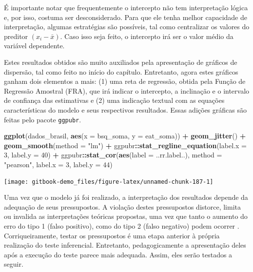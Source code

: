 \documentclass[
]{book}
\newenvironment{Shaded}{\begin{snugshade}}{\end{snugshade}}
\newcommand{\DataTypeTok}[1]{\textcolor[rgb]{0.13,0.29,0.53}{#1}}
\newcommand{\DecValTok}[1]{\textcolor[rgb]{0.00,0.00,0.81}{#1}}
\newcommand{\KeywordTok}[1]{\textcolor[rgb]{0.13,0.29,0.53}{\textbf{#1}}}
\newcommand{\NormalTok}[1]{#1}
\newcommand{\OperatorTok}[1]{\textcolor[rgb]{0.81,0.36,0.00}{\textbf{#1}}}
\newcommand{\StringTok}[1]{\textcolor[rgb]{0.31,0.60,0.02}{#1}}
\begin{document}
É importante notar que frequentemente o intercepto não tem interpretação lógica e, por isso, costuma ser desconsiderado. Para que ele tenha melhor capacidade de interpretação, algumas estratégias são possíveis, tal como centralizar os valores do preditor \((x_i-\bar{x})\). Caso isso seja feito, o intercepto irá ser o valor médio da variável dependente.

Estes resultados obtidos são muito auxiliados pela apresentação de gráficos de dispersão, tal como feito no início do capítulo. Entretanto, agora estes gráficos ganham dois elementos a mais: (1) uma reta de regressão, obtida pela Função de Regressão Amostral (FRA), que irá indicar o intercepto, a inclinação e o intervalo de confiança das estimativas e (2) uma indicação textual com as equações características do modelo e seus respectivos resultados. Essas adições gráficas são feitas pelo pacote \texttt{ggpubr}.

\begin{Shaded}
\begin{Highlighting}[]
\KeywordTok{ggplot}\NormalTok{(dados_brasil, }\KeywordTok{aes}\NormalTok{(}\DataTypeTok{x =}\NormalTok{ bsq_soma, }\DataTypeTok{y =}\NormalTok{ eat_soma)) }\OperatorTok{+}
\StringTok{  }\KeywordTok{geom_jitter}\NormalTok{() }\OperatorTok{+}\StringTok{ }\KeywordTok{geom_smooth}\NormalTok{(}\DataTypeTok{method =} \StringTok{"lm"}\NormalTok{) }\OperatorTok{+}\StringTok{ }
\StringTok{  }\NormalTok{ggpubr}\OperatorTok{::}\KeywordTok{stat_regline_equation}\NormalTok{(}\DataTypeTok{label.x =} \DecValTok{3}\NormalTok{, }\DataTypeTok{label.y =} \DecValTok{40}\NormalTok{) }\OperatorTok{+}
\StringTok{  }\NormalTok{ggpubr}\OperatorTok{::}\KeywordTok{stat_cor}\NormalTok{(}\KeywordTok{aes}\NormalTok{(}\DataTypeTok{label =}\NormalTok{  ..rr.label..), }\DataTypeTok{method =} \StringTok{"pearson"}\NormalTok{, }\DataTypeTok{label.x =} \DecValTok{3}\NormalTok{, }\DataTypeTok{label.y =} \DecValTok{44}\NormalTok{)}
\end{Highlighting}
\end{Shaded}

\begin{center}\texttt{[image: gitbook-demo\_files/figure-latex/unnamed-chunk-187-1]} \end{center}

Uma vez que o modelo já foi realizado, a interpretação dos resultados depende da adequação de seus pressupostos. A violação destes pressupostos distorce, limita ou invalida as interpretações teóricas propostas, uma vez que tanto o aumento do erro do tipo 1 (falso positivo), como do tipo 2 (falso negativo) podem ocorrer \citep{Lix1996, Barker2015, Ernst2017}. Corriqueiramente, testar os pressupostos é uma etapa anterior à própria realização do teste inferencial. Entretanto, pedagogicamente a apresentação deles após a execução do teste parece mais adequada. Assim, eles serão testados a seguir.
\end{document}
